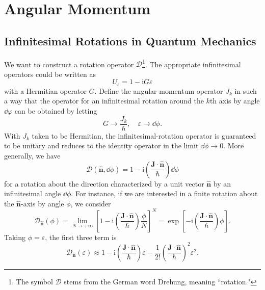 \documentclass{article}
\theoremstyle{1}
\newcommand{\ii}{\mathrm{i}}
\begin{document}
\section{Angular Momentum}
\subsection{Infinitesimal Rotations in Quantum Mechanics}

We want to construct a rotation operator $\mathscr{D}$\footnote{The symbol $\mathscr{D}$ stems from the German word Drehung, meaning ``rotation."}. The appropriate infinitesimal operators could be
written as
\begin{equation}
    U_{\varepsilon}=1-\ii G\varepsilon
\end{equation}
with a Hermitian operator $G$. Define the angular-momentum operator
$J_k$ in such a way that the operator for an infinitesimal rotation around the $k$th axis
by angle $\dd{\varphi}$ can be obtained by letting 
\begin{equation}
    G\rightarrow \frac{J_k}{\hbar},\quad \varepsilon\rightarrow \dd{\phi}.
\end{equation}
With $J_k$ taken to be Hermitian, the infinitesimal-rotation operator is
guaranteed to be unitary and reduces to the identity operator in the limit $\dd{\phi}\rightarrow 0$. More generally, we have
\begin{equation}
    \mathscr{D}(\hat{\mathbf{n}},\dd{\phi})=1-\ii\left(\frac{\mathbf{J}\cdot\hat{\mathbf{n}}}{\hbar}\right)\dd{\phi}
\end{equation}
for a rotation about the direction characterized by a unit vector $\hat{\mathbf{n}}$ by an infinitesimal angle $\dd{\phi}$. For instance, if we are interested in a finite rotation
about the $\hat{\mathbf{n}}$-axis by angle $\phi$, we consider
\begin{equation}
    \mathscr{D}_{\hat{\mathbf{n}}}(\phi)=\lim_{N\rightarrow +\infty}\left[1-\ii\left(\frac{\mathbf{J}\cdot\hat{\mathbf{n}}}{\hbar}\right)\frac{\phi}{N}\right]^N=\exp\left[-\ii\left(\frac{\mathbf{J}\cdot\hat{\mathbf{n}}}{\hbar}\right)\phi\right].
\end{equation}
Taking $\phi=\varepsilon$, the first three term is 
\begin{equation}
    \mathscr{D}_{\hat{\mathbf{n}}}(\varepsilon)\approx 1-\ii\left(\frac{\mathbf{J}\cdot\hat{\mathbf{n}}}{\hbar}\right)\varepsilon-\frac{1}{2!}\left(\frac{\mathbf{J}\cdot\hat{\mathbf{n}}}{\hbar}\right)^2\varepsilon^2.
\end{equation}
\end{document}
